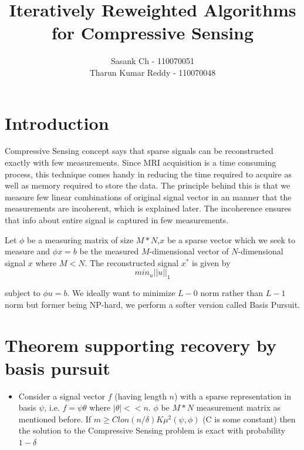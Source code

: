 \documentclass[a4paper]{article}
\begin{document}
\title{Iteratively Reweighted Algorithms for Compressive Sensing}
\author{Sasank Ch - 110070051\\
Tharun Kumar Reddy - 110070048}
\maketitle

\section{Introduction}
Compressive Sensing concept says that sparse signals can be reconstructed exactly with few measurements. Since MRI acquisition is a time consuming process, this technique comes handy in reducing the time required to acquire as well as memory required to store the data. The principle behind this is that we measure few linear combinations of original signal vector in an manner that the measurements are incoherent, which is explained later. The incoherence ensures that info about entire signal is captured in few measurements. 
\par
Let $\phi$ be a measuring matrix of size $M*N$,$x$ be a sparse vector which we seek to measure and $\phi x = b$ be the measured $M$-dimensional vector of $N$-dimensional signal $x$ where $ M<N $. The reconstructed signal $x^*$ is given by 
\begin{equation}
min_u ||u||_1 
\end{equation}

subject to  $\phi u=b$. 
\newline We ideally want to minimize $L-0$ norm rather than $L-1$ norm but former being NP-hard, we perform a softer version called Basis Pursuit.


  


\section{Theorem supporting recovery by basis pursuit}
\begin{itemize}
\item Consider a signal vector $f$ (having length $n$) with a sparse
representation in basis $\psi$, i.e. $f =  \psi \theta$ where $|\theta |<< n$. $\phi$ be $M*N$ measurement matrix as mentioned before.  If $m\geq C lon(n/\delta)K\mu^2(\psi,\phi)$ (C is some constant) then the solution to the Compressive Sensing problem is exact with probability $1-\delta$
\end{itemize}
\end{document}
